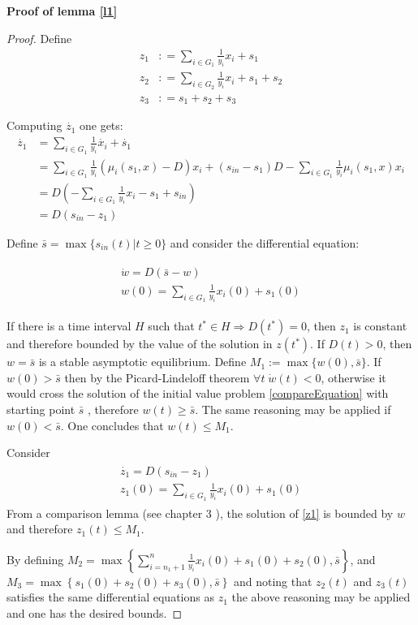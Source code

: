 \documentclass[3p,times]{article}
\begin{document}
\textbf{Proof of lemma \ref{l1}}
\begin{proof}
	Define 
	\begin{align}
	z_1 &: = \sum \limits_{i \in G_1} \frac{1}{y_i}x_i + s_1  \\
	z_2 &: = \sum \limits_{i \in G_2} \frac{1}{y_i}x_i + s_1 + s_2 \\
	z_3 &: = s_1 + s_2 + s_3
	\end{align} 
	
	Computing $\dot{z_{1}}$ one gets:
	\begin{align*}
	\dot{z_{1}} &=\sum \limits_{i \in G_1} \frac{1}{y_i}\dot{x_i} + \dot{s_1} \\
	& = \sum \limits_{i \in G_1} \frac{1}{y_i}\left(\mu_i(s_1,x) -D \right)x_i + (s_{in}-s_1)D-\sum\limits_{i \in G_1}\frac{1}{y_i}\mu_i(s_1,x) x_i   \\
	&= 	D\left(-\sum \limits_{i \in G_1} \frac{1}{y_i}x_i - s_1 + s_{in}\right)  \\
	& = D(s_{in} - z_1)
	\end{align*}
	
	Define $\bar{s} =\max\{s_{in}(t) | t\geq 0\}$ and consider the differential equation:
	
	\begin{align}
	\label{compareEquation}
	\begin{array}{l}
	\dot{w} = D(\bar{s} - w) \\
	w(0) = \sum \limits_{i \in G_1} \frac{1}{y_i}x_i(0) + s_1(0)
	\end{array}
	\end{align}
	
	If there is a time interval $H$ such that $t^*\in H  \Rightarrow D(t^*) = 0$, then $z_1$ is constant and therefore bounded by  the value of the solution in $z(t^*)$. 
	If $D(t) > 0$, then $w = \bar{s}$ is a stable asymptotic equilibrium. Define $M_1 :=  \max\{w(0),\bar{s}\}$. If $ w(0) > \bar{s}$ then by the Picard-Lindeloff theorem $ \forall t \; \dot{w}(t) < 0 $, otherwise it would cross the solution of the initial value problem \eqref{compareEquation} with starting point $\bar{s}$ , therefore $w(t) \geq \bar{s}$. The same reasoning may be applied if $ w(0) < \bar{s}$. One concludes that $ w(t) \leq M_1 $. 
	
	Consider  
	\begin{align}
	\label{z1} \begin{array}{l}
	\dot{z_1} =  D(s_{in} - z_1)\\
	z_1(0) = \sum \limits_{i \in G_1} \frac{1}{y_i}x_i(0) + s_1(0)
	\end{array} 
	\end{align}
	From a comparison lemma (see chapter 3 \cite{Khalil1996}), the solution of \eqref{z1} is bounded by $w$ and therefore $z_1(t) \leq M_1$.
	
	By defining $M_2 = \max\left \{ \displaystyle \sum \limits_{i=n_1 +1 }^{n} \frac{1}{y_i}x_i(0) + s_1(0) +s_2(0), \bar{s} \right\}$, and $M_3 =\max\left \{ s_1(0) +s_2(0) + s_3(0), \bar{s} \right\} $ and noting that $z_2(t)$ and $z_3(t)$ satisfies the same differential equations as $z_1$ the above reasoning may be applied and one has the desired bounds.
\end{proof}
\end{document}
